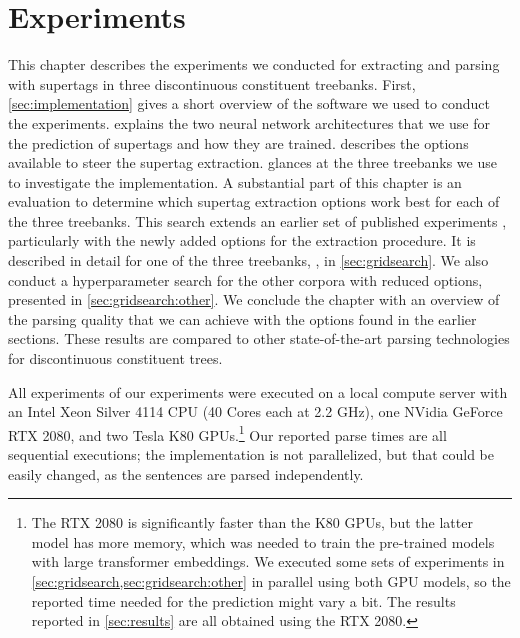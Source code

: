\documentclass[../document.tex]{subfiles}
\begin{document}
    \chapter{Experiments}\label{sec:experiments}
    This chapter describes the experiments we conducted for extracting and parsing with supertags in three discontinuous constituent treebanks.
    First, \cref{sec:implementation} gives a short overview of the software we used to conduct the experiments.
     explains the two neural network architectures that we use for the prediction of supertags and how they are trained.
     describes the options available to steer the supertag extraction.
     glances at the three treebanks we use to investigate the implementation.
    A substantial part of this chapter is an evaluation to determine which supertag extraction options work best for each of the three treebanks.
    This search extends an earlier set of published experiments \citep{Rup22}, particularly with the newly added options for the extraction procedure.
    It is described in detail for one of the three treebanks, \negra{}, in \cref{sec:gridsearch}.
    We also conduct a hyperparameter search for the other corpora with reduced options, presented in \cref{sec:gridsearch:other}.
    We conclude the chapter with an overview of the parsing quality that we can achieve with the options found in the earlier sections.
    These results are compared to other state-of-the-art parsing technologies for discontinuous constituent trees.

    All experiments of our experiments were executed on a local compute server with an Intel Xeon Silver 4114 CPU (40 Cores each at 2.2 GHz), one NVidia GeForce RTX 2080, and two Tesla K80 GPUs.\footnote{
        The RTX 2080 is significantly faster than the K80 GPUs, but the latter model has more memory, which was needed to train the pre-trained models with large transformer embeddings.
        We executed some sets of experiments in \cref{sec:gridsearch,sec:gridsearch:other} in parallel using both GPU models, so the reported time needed for the prediction might vary a bit.
        The results reported in \cref{sec:results} are all obtained using the RTX 2080.
    }
    Our reported parse times are all sequential executions; the implementation is not parallelized, but that could be easily changed, as the sentences are parsed independently.

    
    
    
    
    
    
    

    \ifSubfilesClassLoaded{%
        \printindex
    }{}
\end{document}
